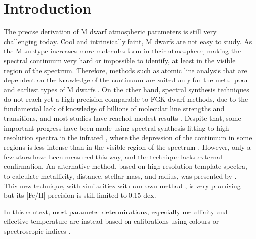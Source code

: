 \documentclass{aa}
\begin{document}

   \maketitle


\section{Introduction}

The precise derivation of M dwarf atmospheric parameters is still very challenging today. Cool and intrinsically faint, M dwarfs are not easy to study. As the M subtype increases more molecules form in their atmosphere, making the spectral continuum very hard or impossible to identify, at least in the visible region of the spectrum. Therefore, methods such as atomic line analysis that are dependent on the knowledge of the continuum are suited only for the metal poor and earliest types of M dwarfs \citep[e.g.][]{Woolf-2005,Woolf-2006}. On the other hand, spectral synthesis techniques do not reach yet a high precision comparable to FGK dwarf methods, due to the fundamental lack of knowledge of billions of molecular line strengths and transitions, and most studies have reached modest results \citep[e.g.][]{Valenti-1998,Bean-2006a}. Despite that, some important progress have been made using spectral synthesis fitting to high-resolution spectra in the infrared \citep{Onehag-2012}, where the depression of the continuum in some regions is less intense than in the visible region of the spectrum \citep[e.g.][]{Rajpurohit-2013b}. However, only a few stars have been measured this way, and the technique lacks external confirmation. An alternative method, based on high-resolution template spectra, to calculate metallicity, distance, stellar mass, and radius, was presented by \citep[][]{Pineda-2013}. This new technique, with similarities with our own method \citep[][]{Neves-2013}, is very promising but its [Fe/H] precision is still limited to 0.15 dex.

In this context, most parameter determinations, especially metallicity and effective temperature are instead based on calibrations using colours \citep[e.g.][]{Bonfils-2005,Johnson-2009,Schlaufman-2010,Johnson-2012,Neves-2012} or spectroscopic indices \citep[e.g.][]{Rojas-Ayala-2010,Rojas-Ayala-2012, Mann-2013a,Mann-2013b,Newton-2013}.
\end{document}
